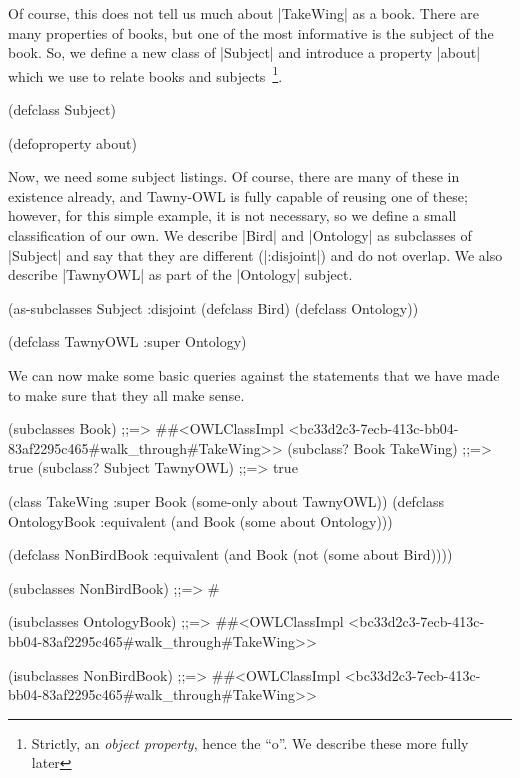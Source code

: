 Of course, this does not tell us much about |TakeWing| as a book. There are
many properties of books, but one of the most informative is the subject of
the book. So, we define a new class of |Subject| and introduce a property
|about| which we use to relate books and subjects~\footnote{Strictly, an
  \emph{object property}, hence the ``o''. We describe these more fully
  later}.

\begin{tawny}
(defclass Subject)

(defoproperty about)
\end{tawny}

Now, we need some subject listings. Of course, there are many of these in
existence already, and Tawny-OWL is fully capable of reusing one of these;
however, for this simple example, it is not necessary, so we define a small
classification of our own. We describe |Bird| and |Ontology| as subclasses of
|Subject| and say that they are different (|:disjoint|) and do not overlap. We
also describe |TawnyOWL| as part of the |Ontology| subject.

\begin{tawny}
(as-subclasses
 Subject
 :disjoint
 (defclass Bird)
 (defclass Ontology))

(defclass TawnyOWL
  :super Ontology)
\end{tawny}

We can now make some basic queries against the statements that we have made to
make sure that they all make sense.


\begin{tawny}
(subclasses Book)
;;=> #{#<OWLClassImpl <bc33d2c3-7ecb-413c-bb04-83af2295c465#walk_through#TakeWing>>}
(subclass? Book TakeWing)
;;=> true
(subclass? Subject TawnyOWL)
;;=> true
\end{tawny}


\begin{tawny}

(class
 TakeWing
 :super
 Book
 (some-only about TawnyOWL))
(defclass
 OntologyBook
 :equivalent
 (and Book
      (some about Ontology)))

(defclass NonBirdBook
  :equivalent
  (and Book
       (not (some about Bird))))


(subclasses NonBirdBook)
;;=> #{}

(isubclasses OntologyBook)
;;=> #{#<OWLClassImpl <bc33d2c3-7ecb-413c-bb04-83af2295c465#walk_through#TakeWing>>}

(isubclasses NonBirdBook)
;;=> #{#<OWLClassImpl <bc33d2c3-7ecb-413c-bb04-83af2295c465#walk_through#TakeWing>>}
\end{tawny}



